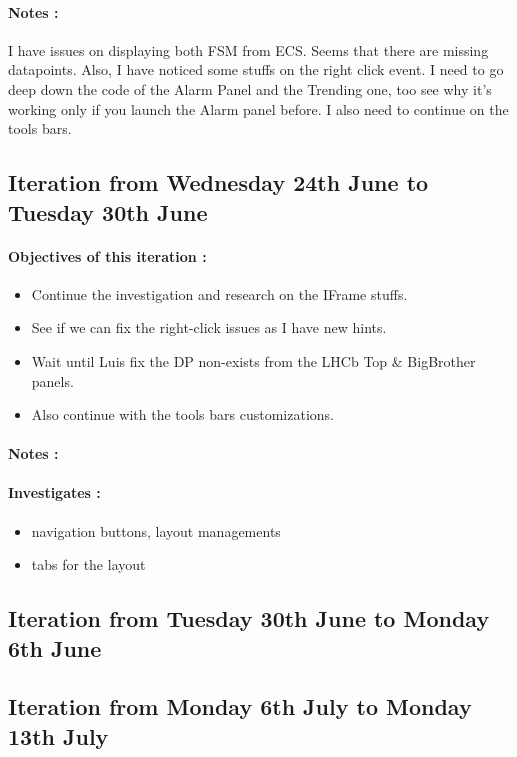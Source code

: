\documentclass[../main.tex]{subfiles}
\begin{document}
\begin{appendix}
    \paragraph{Notes :}
    I have issues on displaying both FSM from ECS. Seems that there are missing datapoints. Also, I have noticed some stuffs on the right click event.
    I need to go deep down the code of the Alarm Panel and the Trending one, too see why it's working only if you launch the Alarm panel before.
    I also need to continue on the tools bars.
    \subsection{Iteration from Wednesday 24th June to Tuesday 30th June}
    \paragraph{Objectives of this iteration :}
    \begin{itemize}
        \item Continue the investigation and research on the IFrame stuffs.
        \item See if we can fix the right-click issues as I have new hints.
        \item Wait until Luis fix the DP non-exists from the LHCb Top \& BigBrother panels.
        \item Also continue with the tools bars customizations.
    \end{itemize}
    \paragraph{Notes :}
    \paragraph{Investigates :}
    \begin{itemize}
        \item navigation buttons, layout managements
        \item tabs for the layout
    \end{itemize}
    \subsection{Iteration from Tuesday 30th June to Monday 6th June}
    \subsection{Iteration from Monday 6th July to Monday 13th July}

\end{appendix}
\end{document}
